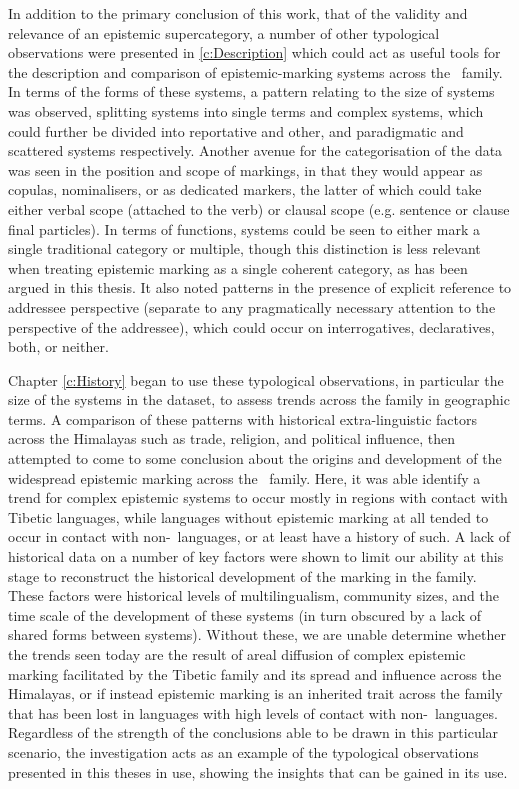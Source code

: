 In addition to the primary conclusion of this work, that of the validity and relevance of an epistemic supercategory, a number of other typological observations were presented in \ref{c:Description} which could act as useful tools for the description and comparison of epistemic-marking systems across the \lfam\ family. In terms of the forms of these systems, a pattern relating to the size of systems was observed, splitting systems into single terms and complex systems, which could further be divided into reportative and other, and paradigmatic and scattered systems respectively. Another avenue for the categorisation of the data was seen in the position and scope of markings, in that they would appear as copulas, nominalisers, or as dedicated markers, the latter of which could take either verbal scope (attached to the verb) or clausal scope (e.g. sentence or clause final particles). In terms of functions, systems could be seen to either mark a single traditional category or multiple, though this distinction is less relevant when treating epistemic marking as a single coherent category, as has been argued in this thesis. It also noted patterns in the presence of explicit reference to addressee perspective (separate to any pragmatically necessary attention to the perspective of the addressee), which could occur on interrogatives, declaratives, both, or neither. 

Chapter \ref{c:History} began to use these typological observations, in particular the size of the systems in the dataset, to assess trends across the family in geographic terms. A comparison of these patterns with historical extra-linguistic factors across the Himalayas such as trade, religion, and political influence, then attempted to come to some conclusion about the origins and development of the widespread epistemic marking across the \lfam\ family. Here, it was able identify a trend for complex epistemic systems to occur mostly in regions with contact with Tibetic languages, while languages without epistemic marking at all tended to occur in contact with non-\lfam\ languages, or at least have a history of such. A lack of historical data on a number of key factors were shown to limit our ability at this stage to reconstruct the historical development of the marking in the family. These factors were historical levels of multilingualism, community sizes, and the time scale of the development of these systems (in turn obscured by a lack of shared forms between systems). Without these, we are unable determine whether the trends seen today are the result of areal diffusion of complex epistemic marking facilitated by the Tibetic family and its spread and influence across the Himalayas, or if instead epistemic marking is an inherited trait across the family that has been lost in languages with high levels of contact with non-\lfam\ languages. Regardless of the strength of the conclusions able to be drawn in this particular scenario, the investigation acts as an example of the typological observations presented in this theses in use, showing the insights that can be gained in its use.

